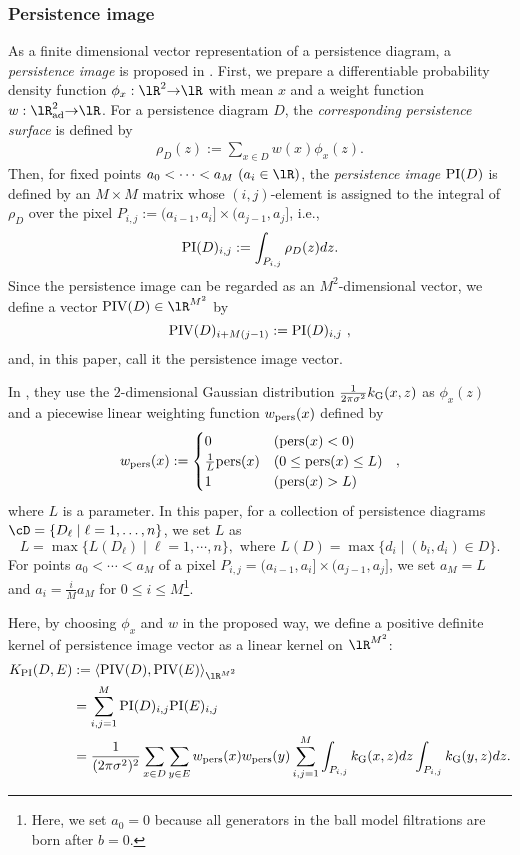 \documentclass{article}
\newcommand{\ra}{{\rightarrow}}
\newcommand{\pers}{{\rm pers}}
\providecommand{\inn}[2]{\langle #1, #2 \rangle}
\begin{document}
\subsubsection{Persistence image}
\label{subsubsec:pi}
As a finite dimensional vector representation of a persistence diagram, a {\em persistence image} is proposed in \cite{AEKNPSCHMZ17}.
First, we prepare a differentiable probability density function $\phi_{x}:\lR^{2} \ra \lR$ with mean $x$ and a weight function $w:\lR^{2}_{{\rm ad}} \ra \lR$. For a persistence diagram $D$, the {\em corresponding persistence surface} is defined by
\begin{align}
\rho_{D}(z) := \sum_{x \in D} w(x)\phi_{x}(z). \label{eq:pi}
\end{align}
Then, for fixed points $a_{0} < \cdots < a_{M} ~ (a_{i} \in \lR)$, the {\em persistence image} ${\rm PI}(D)$ is defined by an $M \times M$ matrix whose $(i,j)$-element is assigned to the integral of $\rho_{D}$ over the pixel $P_{i,j}:=(a_{i-1},a_{i}] \times (a_{j-1},a_{j}]$, i.e., 
\[
{\rm PI}(D)_{i,j}: = \int _{ P_{i,j}} \rho_{D}(z) dz.
\]
Since the persistence image can be regarded as an $M^{2}$-dimensional vector, we define a vector ${\rm PIV}(D) \in \lR^{M^{2}}$ by
\[
{\rm PIV}(D)_{i+M (j -1)}: = {\rm PI}(D)_{i, j} ~ ,
\]
and, in this paper, call it the persistence image vector.

In \cite{AEKNPSCHMZ17}, they use the $2$-dimensional Gaussian distribution $\frac{1}{2\pi \sigma^{2}}k_{{\rm G}}(x,z)$ as $\phi_{x}(z)$ and a piecewise linear weighting function $w_{{\rm pers}}(x)$ defined by
\begin{align*}
w_{{\rm pers}}(x):=
\begin{cases}
0 & (\pers(x) < 0) \\
\frac{1}{L} \pers(x)& (0 \leq \pers(x) \leq L) \\
1 & (\pers(x)>L)
\end{cases} ~~,
\end{align*}
where $L$ is a parameter.
In this paper, for a collection of persistence diagrams $\cD=\{D_{\ell} \mid \ell=1,\ldots,n\}$, we set $L$ as 
\[
L=\max \{ L(D_{\ell}) \mid \ell=1,\cdots,n \}, \mbox{ where } L(D)=\max \{ d_{i} \mid (b_{i},d_{i}) \in D\}. 
\]
For points $a_{0} < \cdots < a_{M}$ of a pixel $P_{i,j}=(a_{i-1},a_{i}] \times (a_{j-1},a_{j}]$, we set $a_{M}=L$ and $a_{i}=\frac{i}{M}a_{M}$ for $0 \leq i \leq M$\footnote{Here, we set $a_{0}=0$ because all generators in the ball model filtrations are born after $b=0$.}.

Here, by choosing $\phi_{x}$ and $w$ in the proposed way, we define a positive definite kernel of persistence image vector as a linear kernel on $\lR^{M^{2}}$:
\begin{align}
K_{{\rm PI}}(D,E)&:=\inn{{\rm PIV}(D)}{{\rm PIV}(E)}_{\lR^{M^{2}}} \nonumber \\
&=\sum_{i,j=1}^{M}{\rm PI}(D)_{i,j}{\rm PI}(E)_{i,j} \nonumber \\
&=\frac{1}{(2\pi\sigma^{2})^{2}} \sum_{x \in D} \sum_{y \in E} w_{{\rm pers}}(x)w_{{\rm pers}}(y) \sum_{i,j=1}^{M} \int_{P_{i,j}} k_{{\rm G}}(x,z) dz \int_{P_{i,j}} k_{{\rm G}}(y,z) dz . \label{eq:inner_pi}
\end{align}
\end{document}
